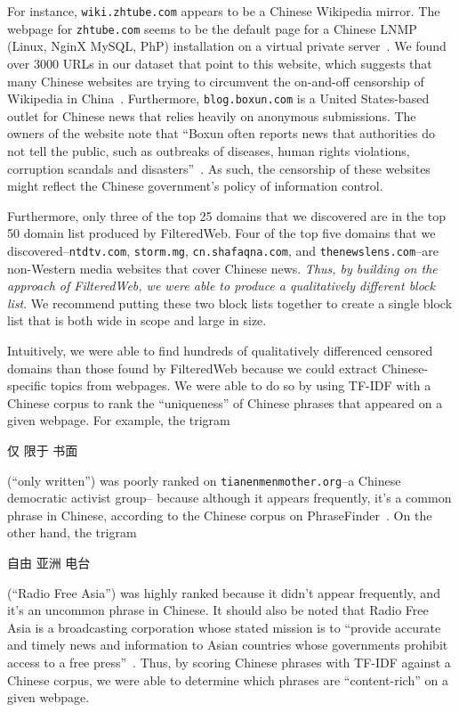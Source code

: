 For instance, \texttt{wiki.zhtube.com} appears to be a Chinese
Wikipedia mirror. The webpage for \texttt{zhtube.com} seems to be the
default page for a Chinese LNMP (Linux, NginX MySQL, PhP) installation
on a virtual private server~\cite{lnmp}. We found over 3000 URLs in
our dataset that point to this website, which suggests that many
Chinese websites are trying to circumvent the on-and-off censorship of
Wikipedia in China~\cite{wikipedia-china}. Furthermore,
\texttt{blog.boxun.com} is a United States-based outlet for Chinese
news that relies heavily on anonymous submissions. The owners of the
website note that ``Boxun often reports news that authorities do not
tell the public, such as outbreaks of diseases, human rights
violations, corruption scandals and disasters''~\cite{boxun-about}. As
such, the censorship of these websites might reflect the Chinese
government's policy of information control.

Furthermore, only three of the top 25 domains that we discovered are in
the top 50 domain list produced by FilteredWeb. Four of the top five
domains that we discovered--\texttt{ntdtv.com},
\texttt{storm.mg}, \texttt{cn.shafaqna.com}, and
\texttt{thenewslens.com}--are non-Western media websites that cover
Chinese news. \textit{Thus, by building on the
approach of FilteredWeb, we were able to produce a qualitatively
different block list}. We recommend putting these two block lists
together to create a single block list that is both wide in scope and
large in size.

Intuitively, we were able to find hundreds of qualitatively
differenced censored domains than those found by FilteredWeb because
we could extract Chinese-specific topics from webpages. We were able
to do so by using TF-IDF with a Chinese corpus to rank the
``uniqueness'' of Chinese phrases that appeared on a given
webpage. For example, the trigram
\begin{CJK*}{UTF8}{gbsn}仅 限于 书面\end{CJK*} (``only written'') was poorly ranked on
\texttt{tianenmenmother.org}--a Chinese democratic activist group--
because although it appears frequently, it's a common phrase in
Chinese, according to the Chinese corpus on
PhraseFinder~\cite{phrasefinder}. On the other hand, the
trigram \begin{CJK*}{UTF8}{gbsn}自由 亚洲 电台\end{CJK*} (``Radio Free
Asia'') was highly ranked because it didn't appear frequently, and
it's an uncommon phrase in Chinese. It should also be noted that Radio
Free Asia is a broadcasting corporation whose stated mission is to
``provide accurate and timely news and information to Asian countries
whose governments prohibit access to a free
press''~\cite{rfa:about}. Thus, by scoring Chinese phrases with TF-IDF
against a Chinese corpus, we were able to determine which phrases are
``content-rich'' on a given webpage.

